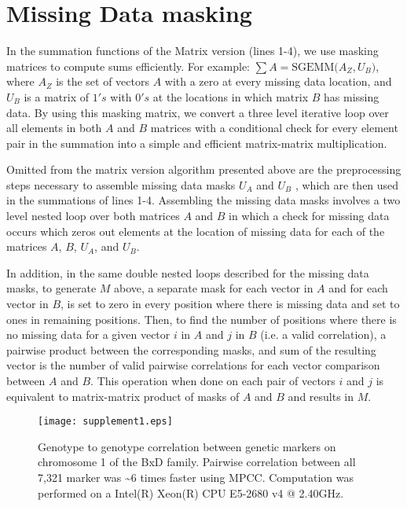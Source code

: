 \documentclass{bioinfo}
\begin{document}
\section{Missing Data masking} \label{MDBM}
In the summation functions of the Matrix version (lines 1-4), we use masking matrices to compute 
sums efficiently. For example: $\sum A=\text{SGEMM(}A_Z,U_B\text{)}$, where $A_Z$ is the set of 
vectors $A$ with a zero at every missing data location, and $U_B$ is a matrix of $1's$ with $0's$ 
at the locations in which matrix $B$ has missing data. By using this masking matrix, we convert a 
three level iterative loop over all elements in both $A$ and $B$ matrices with a conditional check 
for every element pair in the summation into a simple and efficient matrix-matrix multiplication.

Omitted from the matrix version algorithm presented above are the preprocessing steps necessary to 
assemble missing data masks $U_A$ and $U_B$ , which are then used in the summations of lines 1-4.
Assembling the missing data masks involves a two level nested loop over both matrices $A$ and $B$ in 
which a check for missing data occurs which zeros out elements at the location of missing data for 
each of the matrices $A$, $B$, $U_A$, and $U_B$.

In addition, in the same double nested loops described for the missing data masks, to 
generate $M$ above, a separate mask for each vector in $A$ and for each vector in $B$, 
is set to zero in every position where there is missing data and set to ones in remaining positions.
Then, to find the number of positions where there is no missing data for a given vector $i$ 
in $A$ and $j$ in $B$ (i.e. a valid correlation), a pairwise product between the corresponding masks, 
and sum of the resulting vector is the number of valid
pairwise correlations for each vector comparison between $A$ and $B$. This operation when done 
on each pair of vectors $i$ and $j$ is equivalent to matrix-matrix product of masks of 
$A$ and $B$ and results in $M$.

\begin{figure}[H]
\centering
\texttt{[image: supplement1.eps]}
  \caption{ \small Genotype to genotype correlation between genetic markers on chromosome 
    1 of the BxD family. Pairwise correlation between all 7,321 marker was \textasciitilde{}6 times 
    faster using MPCC. Computation was performed on a Intel(R) Xeon(R) CPU E5-2680 v4 @ 2.40GHz.  }
\end{figure}
\end{document}
